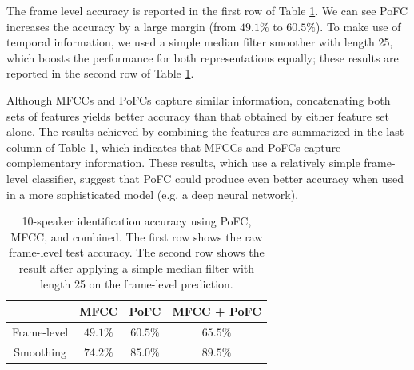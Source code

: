 \documentclass{article} %
\begin{document}
The frame level accuracy is reported in the first row of Table
\ref{tab:spk}. We can see PoFC increases the accuracy by a large
margin (from $49.1\%$ to $60.5\%$). To make use of temporal
information, we used a simple median filter smoother with length 25,
which boosts the performance for both representations equally; these
results are reported in the second row of Table \ref{tab:spk}.

Although MFCCs and PoFCs capture similar information, concatenating
both sets of features yields better accuracy than that obtained by
either feature set alone. The results achieved by combining the
features are summarized in the last column of Table \ref{tab:spk},
which indicates that MFCCs and PoFCs capture complementary
information. These results, which use a relatively simple frame-level
classifier, suggest that PoFC could produce even better accuracy when
used in a more sophisticated model (e.g. a deep neural network).

\begin{table}[t]
\caption{10-speaker identification accuracy using PoFC, MFCC, and combined. The first row shows the raw frame-level test accuracy. The second row shows the result after applying a simple median filter with length 25 on the frame-level prediction.}
\begin{center}
\begin{tabular}{| c || c | c | c |}
  \hline                        
   & MFCC & PoFC & MFCC + PoFC \\ \hline
  Frame-level & $49.1\%$ & $60.5\%$  & $65.5\%$\\ \hline
  Smoothing  & $74.2\%$ & $85.0\%$ & $89.5\%$\\
  \hline  
\end{tabular}\label{tab:spk}
\end{center}
\end{table}
\end{document}
